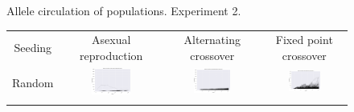 \documentclass{article}
\begin{document}
\begin{landscape}
\begin{figure}[t]
\begin{center}
\begin{tabular}{c c c c}
\end{tabular}
\end{center}
\caption{Allele circulation of populations. Experiment 2.}
\label{fig:ac/e2}
\end{figure}

\begin{figure}[t]
\begin{center}
\begin{tabular}{c c c c}
    Seeding & Asexual reproduction & Alternating crossover & Fixed point crossover \\
    Random & \includegraphics[align=c,width=0.42\textwidth]{ac/e3/1} & \includegraphics[align=c,width=0.42\textwidth]{ac/e3/2} & \includegraphics[align=c,width=0.42\textwidth]{ac/e3/3} \\
    & & & \\

\end{tabular}
\end{center}
\end{figure}
\end{landscape}
\end{document}
